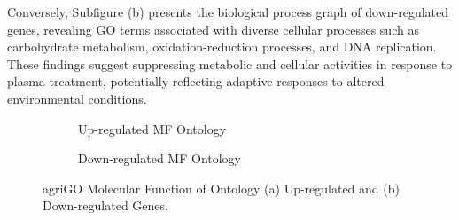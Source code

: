 \documentclass[12pt,letterpaper]{article}
\begin{document}
Conversely, Subfigure (b) presents the biological process graph of down-regulated genes, revealing GO terms associated with diverse cellular processes such as carbohydrate metabolism, oxidation-reduction processes, and DNA replication. These findings suggest suppressing metabolic and cellular activities in response to plasma treatment, potentially reflecting adaptive responses to altered environmental conditions.

\begin{figure}[H]
    \centering
\begin{subfigure}[b]{0.4\textwidth}
    \centering
    \caption{Up-regulated MF Ontology}
    \label{fig:enter-label}
\end{subfigure}
\begin{subfigure}[b]{0.55\textwidth}
    \centering
    \caption{Down-regulated MF Ontology}
    \label{fig:enter-label}
\end{subfigure}
\caption{agriGO Molecular Function of Ontology (a) Up-regulated and (b) Down-regulated Genes.}
\end{figure}
\end{document}

